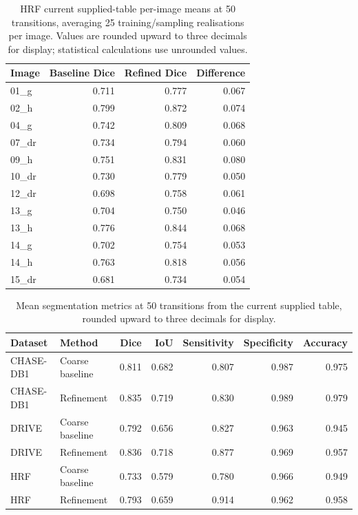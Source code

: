 \documentclass[jimaging,article,submit,pdftex,moreauthors]{Definitions/mdpi}%
\begin{document}
\begin{table}[htbp]
\centering
\caption{HRF current supplied-table per-image means at 50 transitions, averaging 25 training/sampling realisations per image. Values are rounded upward to three decimals for display; statistical calculations use unrounded values.}
\label{tab:hrf_per_image_supplied}
\scriptsize
\begin{tabular}{lrrr}
\toprule
Image & Baseline Dice & Refined Dice & Difference \\
\midrule
01\_g & 0.711 & 0.777 & 0.067 \\
02\_h & 0.799 & 0.872 & 0.074 \\
04\_g & 0.742 & 0.809 & 0.068 \\
07\_dr & 0.734 & 0.794 & 0.060 \\
09\_h & 0.751 & 0.831 & 0.080 \\
10\_dr & 0.730 & 0.779 & 0.050 \\
12\_dr & 0.698 & 0.758 & 0.061 \\
13\_g & 0.704 & 0.750 & 0.046 \\
13\_h & 0.776 & 0.844 & 0.068 \\
14\_g & 0.702 & 0.754 & 0.053 \\
14\_h & 0.763 & 0.818 & 0.056 \\
15\_dr & 0.681 & 0.734 & 0.054 \\
\bottomrule
\end{tabular}
\end{table}

\begin{table}[htbp]
\centering
\caption{Mean segmentation metrics at 50 transitions from the current supplied table, rounded upward to three decimals for display.}
\label{tab:supplied_paired_metric_means}
\scriptsize
\begin{tabular}{llrrrrr}
\toprule
Dataset & Method & Dice & IoU & Sensitivity & Specificity & Accuracy \\
\midrule
CHASE-DB1 & Coarse baseline & 0.811 & 0.682 & 0.807 & 0.987 & 0.975 \\
CHASE-DB1 & Refinement & 0.835 & 0.719 & 0.830 & 0.989 & 0.979 \\
DRIVE & Coarse baseline & 0.792 & 0.656 & 0.827 & 0.963 & 0.945 \\
DRIVE & Refinement & 0.836 & 0.718 & 0.877 & 0.969 & 0.957 \\
HRF & Coarse baseline & 0.733 & 0.579 & 0.780 & 0.966 & 0.949 \\
HRF & Refinement & 0.793 & 0.659 & 0.914 & 0.962 & 0.958 \\
\bottomrule
\end{tabular}
\end{table}
\end{document}
